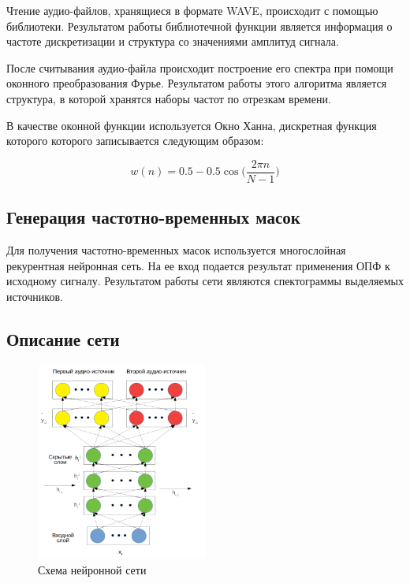 Чтение аудио-файлов, хранящиеся в формате WAVE, происходит с помощью библиотеки. Результатом работы библиотечной функции является информация о частоте дискретизации и структура со значениями амплитуд сигнала. 

После считывания аудио-файла происходит построение его спектра при помощи оконного преобразования Фурье. Результатом работы этого алгоритма является структура, в которой хранятся наборы частот по отрезкам времени.

В качестве оконной функции используется Окно Ханна, дискретная функция которого которого записывается следующим образом:

\begin{equation}
w(n) = 0.5 - 0.5 \cos \Big(\frac{2\pi n}{N-1}\Big)
\end{equation}

\subsection{Генерация частотно-временных масок}

Для получения частотно-временных масок используется многослойная рекурентная нейронная сеть. На ее вход подается результат применения ОПФ к исходному сигналу. Результатом работы сети являются спектограммы выделяемых источников.

\subsection{Описание сети}

\begin{figure}
	\centering
	\includegraphics[width=0.5\textwidth]{inc/img/drnn-design}
	\caption{Схема нейронной сети}
	\label{des:drnn}
\end{figure}

